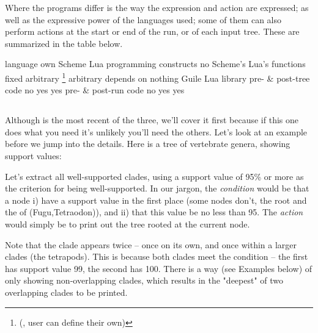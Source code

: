 Where the programs differ is the way the expression and action are expressed; as
well as the expressive power of the languages used; some of them can also
perform actions at the start or end of the run, or of each input tree. These are
summarized in the table below.

\startplacesilenttable
  \startlocalfootnotes

		\starttabulate[|l|l|l|l|]
			\NC \NC \ed \NC \sched \NC \luaed \NC\NR
			\HL
			\NC language 								\NC own 		\NC Scheme 		\NC Lua \NC\NR
			\NC programming constructs 	\NC no 			\NC Scheme's 	\NC Lua's \NC\NR
			\NC functions 							\NC fixed		\NC arbitrary \footnote{(\ie, user can define their own)} \NC arbitrary \NC\NR
			\NC depends on 							\NC nothing \NC \gnu{} Guile \NC Lua library \NC\NR
			\NC pre- \& post-tree code 	\NC no 			\NC yes 			\NC yes \NC\NR
			\NC pre- \& post-run code 	\NC no 			\NC yes 			\NC yes \NC\NR
		\stoptabulate

		\placelocalfootnotes

  \stoplocalfootnotes
\stopplacesilenttable

\subsection[sct:luaed]{\luaed}


Although \luaed{} is the most recent of the three, we'll cover it first because
if this one does what you need it's unlikely you'll need the others.  Let's look
at an example before we jump into the details. Here is a tree of vertebrate
genera, showing support values:


Let's extract all well-supported clades, using a support value of
95\% or more as the criterion for being well-supported. In our jargon, the
{\em condition} would be that a node i) have a support value in the first place
(some nodes don't, \eg{} the root and the \lca{} of (Fugu,Tetraodon)), and ii)
that this value be no less than 95. The {\em action} would simply be to print
out the tree rooted at the current node.


Note that the  clade appears twice -- once on
its own, and once within a larger clades (the tetrapods). This is because both
clades meet the condition -- the first has support value 99, the second has 100.
There is a way (see Examples below) of only showing non-overlapping clades,
which results in the "deepest" of two overlapping clades to be printed.


